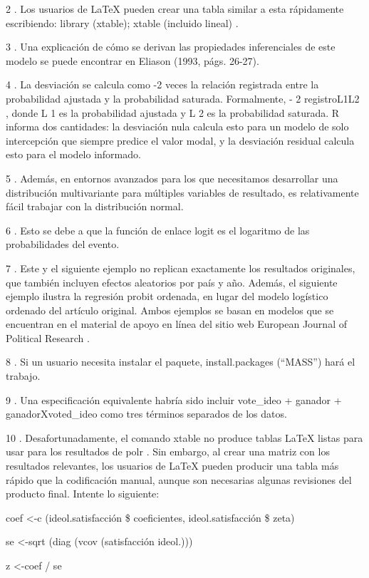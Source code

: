\documentclass[
]{book}
\begin{document}
2 .
Los usuarios de LaTeX pueden crear una tabla similar a esta rápidamente escribiendo: library (xtable); xtable (incluido lineal) .

3 .
Una explicación de cómo se derivan las propiedades inferenciales de este modelo se puede encontrar en Eliason (1993, págs. 26-27).

4 .
La desviación se calcula como -2 veces la relación registrada entre la probabilidad ajustada y la probabilidad saturada. Formalmente, - 2 registroL1L2 , donde L 1 es la probabilidad ajustada y L 2 es la probabilidad saturada. R informa dos cantidades: la desviación nula calcula esto para un modelo de solo intercepción que siempre predice el valor modal, y la desviación residual calcula esto para el modelo informado.

5 .
Además, en entornos avanzados para los que necesitamos desarrollar una distribución multivariante para múltiples variables de resultado, es relativamente fácil trabajar con la distribución normal.

6 .
Esto se debe a que la función de enlace logit es el logaritmo de las probabilidades del evento.

7 .
Este y el siguiente ejemplo no replican exactamente los resultados originales, que también incluyen efectos aleatorios por país y año. Además, el siguiente ejemplo ilustra la regresión probit ordenada, en lugar del modelo logístico ordenado del artículo original. Ambos ejemplos se basan en modelos que se encuentran en el material de apoyo en línea del sitio web European Journal of Political Research .

8 .
Si un usuario necesita instalar el paquete, install.packages (``MASS'') hará el trabajo.

9 .
Una especificación equivalente habría sido incluir vote\_ideo + ganador + ganadorXvoted\_ideo como tres términos separados de los datos.

10 .
Desafortunadamente, el comando xtable no produce tablas LaTeX listas para usar para los resultados de polr . Sin embargo, al crear una matriz con los resultados relevantes, los usuarios de LaTeX pueden producir una tabla más rápido que la codificación manual, aunque son necesarias algunas revisiones del producto final. Intente lo siguiente:

coef \textless-c (ideol.satisfacción \$ coeficientes, ideol.satisfacción \$ zeta)

se \textless-sqrt (diag (vcov (satisfacción ideol.)))

z \textless-coef / se
\end{document}

